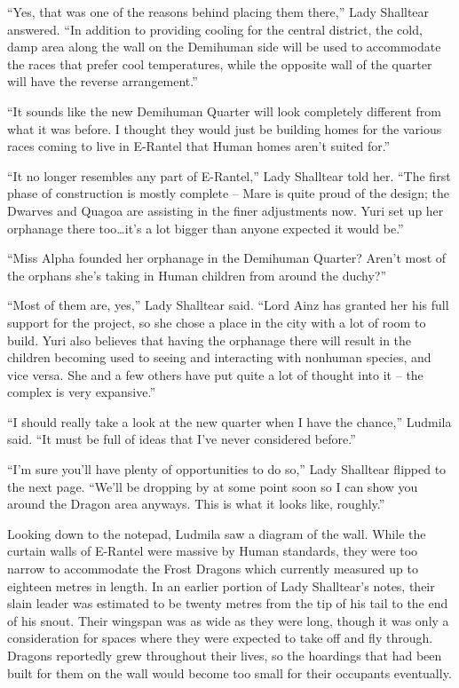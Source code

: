  

“Yes, that was one of the reasons behind placing them there,” Lady Shalltear answered. “In addition to providing cooling for the central district, the cold, damp area along the wall on the Demihuman side will be used to accommodate the races that prefer cool temperatures, while the opposite wall of the quarter will have the reverse arrangement.”

 

“It sounds like the new Demihuman Quarter will look completely different from what it was before. I thought they would just be building homes for the various races coming to live in E-Rantel that Human homes aren’t suited for.”

 

“It no longer resembles any part of E-Rantel,” Lady Shalltear told her. “The first phase of construction is mostly complete – Mare is quite proud of the design; the Dwarves and Quagoa are assisting in the finer adjustments now. Yuri set up her orphanage there too…it’s a lot bigger than anyone expected it would be.”

 

“Miss Alpha founded her orphanage in the Demihuman Quarter? Aren’t most of the orphans she’s taking in Human children from around the duchy?”

 

“Most of them are, yes,” Lady Shalltear said. “Lord Ainz has granted her his full support for the project, so she chose a place in the city with a lot of room to build. Yuri also believes that having the orphanage there will result in the children becoming used to seeing and interacting with nonhuman species, and vice versa. She and a few others have put quite a lot of thought into it – the complex is very expansive.”

 

“I should really take a look at the new quarter when I have the chance,” Ludmila said. “It must be full of ideas that I’ve never considered before.”

 

“I’m sure you’ll have plenty of opportunities to do so,” Lady Shalltear flipped to the next page. “We’ll be dropping by at some point soon so I can show you around the Dragon area anyways. This is what it looks like, roughly.”

 

Looking down to the notepad, Ludmila saw a diagram of the wall. While the curtain walls of E-Rantel were massive by Human standards, they were too narrow to accommodate the Frost Dragons which currently measured up to eighteen metres in length. In an earlier portion of Lady Shalltear’s notes, their slain leader was estimated to be twenty metres from the tip of his tail to the end of his snout. Their wingspan was as wide as they were long, though it was only a consideration for spaces where they were expected to take off and fly through. Dragons reportedly grew throughout their lives, so the hoardings that had been built for them on the wall would become too small for their occupants eventually.

